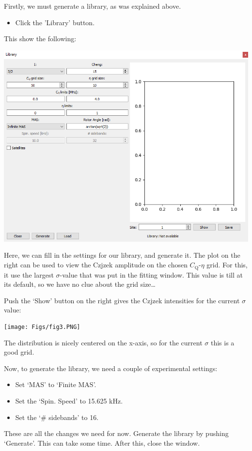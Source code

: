 \documentclass[11pt,a4paper]{article}
\begin{document}
Firstly, we must generate a library, as was explained above.

\begin{itemize}
  \item Click the 'Library' button.
\end{itemize}
This show the following:
\begin{center}
\includegraphics[width=0.8\linewidth]{Figs/fig2.PNG}
\end{center}
Here, we can fill in the settings for our library, and generate it. The plot on the right can be used to view the Czjzek amplitude on the chosen $C_\text{Q}$-$\eta$ grid. For this, it use the largest $\sigma$-value that was put in the fitting window. This value is till at its default, so we have no clue about the grid size\ldots

Push the `Show' button on the right gives the Czjzek intensities for the current $\sigma$ value:
\begin{center}
\texttt{[image: Figs/fig3.PNG]}
\end{center}

The distribution is nicely centered on the x-axis, so for the current $\sigma$ this is a good grid.

Now, to generate the library, we need a couple of experimental settings:
\begin{itemize}
  \item Set `MAS' to `Finite MAS'.
  \item Set the `Spin. Speed' to 15.625 kHz.
  \item Set the `\# sidebands' to 16.
\end{itemize}
These are all the changes we need for now. Generate the library by pushing `Generate'. This can take some time. After this, close the window.
\end{document}
